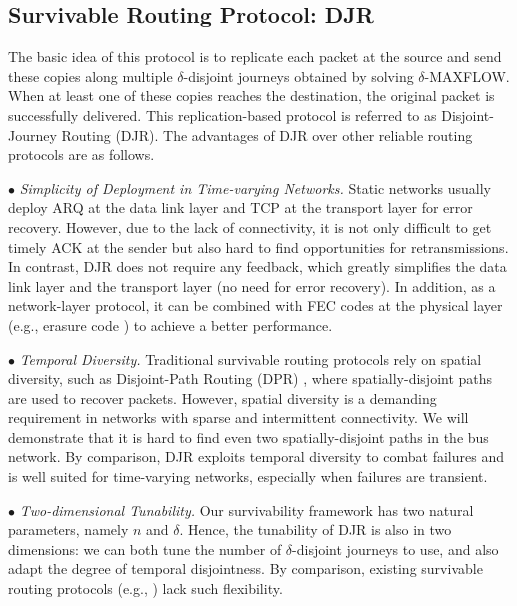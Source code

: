 \documentclass[10pt, conference, letterpaper]{IEEEtran}
\begin{document}
\subsection{Survivable Routing Protocol: DJR}\label{proto}
The basic idea of this protocol is to replicate each packet at the source and send these copies along multiple $\delta$-disjoint journeys obtained by solving $\delta$-MAXFLOW. When at least one of these copies reaches the destination, the original packet is successfully delivered. This replication-based protocol is referred to as Disjoint-Journey Routing (DJR). The advantages of DJR over other reliable routing protocols are as follows.

\vspace{1mm}

\noindent $\bullet$ {\emph{Simplicity of Deployment in Time-varying Networks.} Static networks usually deploy ARQ at the data link layer and TCP at the transport layer for error recovery. However, due to the lack of connectivity, it is not only difficult to get timely ACK at the sender but also hard to find opportunities for retransmissions. In contrast, DJR does not require any feedback, which greatly simplifies the data link layer and the transport layer (no need for error recovery). In addition, as a network-layer protocol, it can be  combined with FEC codes at the physical layer (e.g., erasure code \cite{redundancy}) to achieve a better performance.}

\vspace{1mm}

\noindent $\bullet$ {\emph{Temporal Diversity.} Traditional survivable routing protocols rely on spatial diversity, such as Disjoint-Path Routing (DPR)  \cite{dis_protect1}\cite{dis_protect2}, where spatially-disjoint paths are used to recover packets. However, spatial diversity is a demanding requirement in networks with sparse and intermittent connectivity. We will demonstrate that it is hard to find even two spatially-disjoint paths in the bus network. By comparison, DJR exploits temporal diversity to combat failures and is well suited for time-varying networks, especially when failures are transient.}

\vspace{1mm}

\noindent $\bullet$ {\emph{Two-dimensional Tunability.} Our survivability framework has two natural parameters, namely $n$ and $\delta$. Hence, the tunability of DJR is also in two dimensions: we can both tune the number of $\delta$-disjoint journeys to use, and also adapt the degree of temporal disjointness. By comparison, existing survivable routing protocols (e.g., \cite{DTN_routing1, DTN_routing2, DTN_routing3}) lack such flexibility. }
\end{document}
